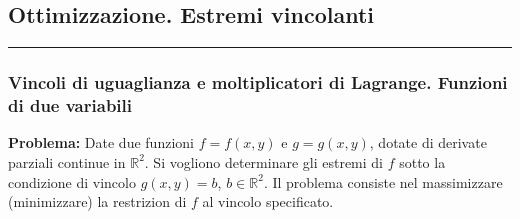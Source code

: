 \subsection*{Ottimizzazione. Estremi vincolanti}
\rule{\textwidth}{0,4pt}
\subsubsection*{Vincoli di uguaglianza e moltiplicatori di Lagrange. Funzioni di due variabili}
\textbf{Problema:} Date due funzioni $f= f(x,y)$ e $g = g(x,y)$, dotate di derivate parziali continue in $\mathbb{R}^2$. Si vogliono determinare gli estremi di $f$ sotto la condizione di vincolo $g(x,y) = b$, $b \in \mathbb{R}^2$.\newline
Il problema consiste nel massimizzare (minimizzare) la restrizion di $f$ al vincolo specificato.
